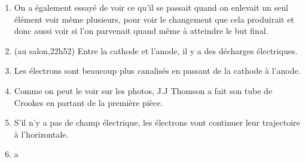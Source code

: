\documentclass[../main.tex]{subfiles}
\begin{document}
\begin{enumerate}
    \item On a également essayé de voir ce qu'il se passait quand on enlevait un seul élément voir même plusieurs, pour voir le changement que cela produirait et donc aussi voir si l'on parvenait quand même à atteindre le but final.
    \item (au salon,22h52) Entre la cathode et l'anode, il y a des décharges électriques.
    \item Les électrons sont beaucoup plus canalisés en passant de la cathode à l'anode. 
    \item Comme on peut le voir sur les photos, J.J Thomson a fait son tube de Crookes en partant de la première pièce. 
    \item S'il n'y a pas de champ électrique, les électrons vont continuer leur trajectoire à l'horizontale. 
    \item a
    
\end{enumerate}
\end{document}
